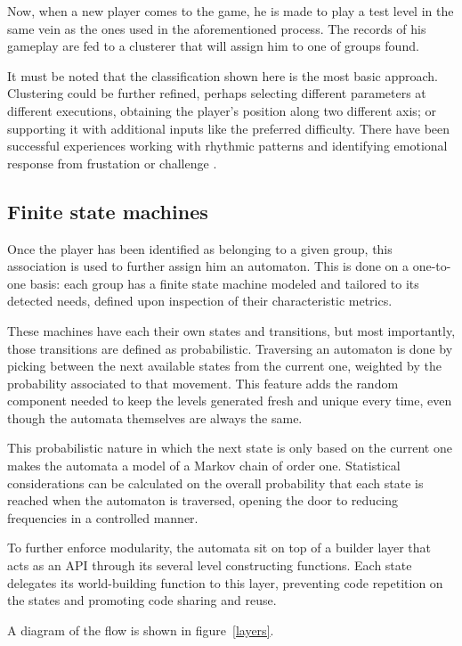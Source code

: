 \documentclass[conference]{IEEEtran}
\begin{document}
Now, when a new player comes to the game, he is made to play a test level in the same vein as the ones used in the aforementioned process. The records of his gameplay are fed to a clusterer that will assign him to one of groups found.

It must be noted that the classification shown here is the most basic approach. Clustering could be further refined, perhaps selecting different parameters at different executions, obtaining the player's position along two different axis; or supporting it with additional inputs like the preferred difficulty. There have been successful experiences working with rhythmic patterns \cite{rhythm09} and identifying emotional response from frustation or challenge \cite{shaker10}.

\subsection{Finite state machines}

Once the player has been identified as belonging to a given group, this association is used to further assign him an automaton. This is done on a one-to-one basis: each group has a finite state machine modeled and tailored to its detected needs, defined upon inspection of their characteristic metrics.

These machines have each their own states and transitions, but most importantly, those transitions are defined as probabilistic. Traversing an automaton is done by picking between the next available states from the current one, weighted by the probability associated to that movement. This feature adds the random component needed to keep the levels generated fresh and unique every time, even though the automata themselves are always the same.

This probabilistic nature in which the next state is only based on the current one makes the automata a model of a Markov chain of order one. Statistical considerations can be calculated on the overall probability that each state is reached when the automaton is traversed, opening the door to reducing frequencies in a controlled manner.

To further enforce modularity, the automata sit on top of a builder layer that acts as an API through its several level constructing functions. Each state delegates its world-building function to this layer, preventing code repetition on the states and promoting code sharing and reuse.

A diagram of the flow is shown in figure~\ref{layers}.
\end{document}
